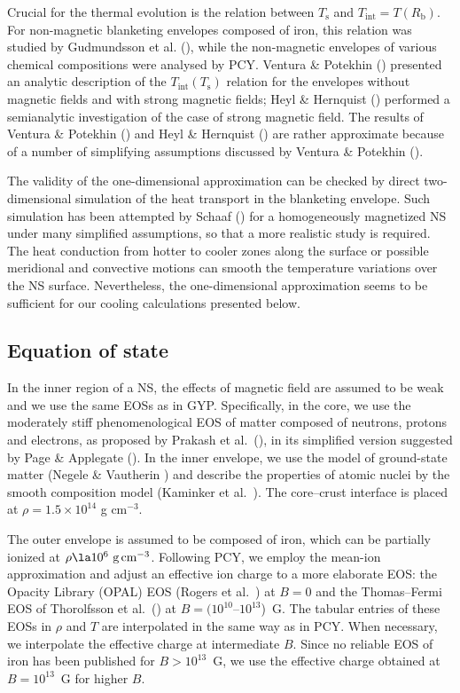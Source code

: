 \documentclass{aa}
\begin{document}
Crucial for the thermal evolution is the relation between
$T_\mathrm{s}$ and $T_\mathrm{int}=T(R_\mathrm{b})$. 
For non-magnetic blanketing envelopes composed of iron,
this relation was studied by Gudmundsson et al. (\cite{gpe83}),
while the non-magnetic envelopes of various chemical compositions
were analysed by PCY.
Ventura \& Potekhin (\cite{elounda})
presented an analytic description of
the $T_\mathrm{int}(T_\mathrm{s})$ relation
for the envelopes without magnetic fields and with
strong magnetic fields; Heyl \& Hernquist (\cite{hh-theory})
performed a 
semianalytic investigation of the case of strong magnetic field.
The results of Ventura \& Potekhin (\cite{elounda})
and Heyl \& Hernquist (\cite{hh-theory})
are rather approximate because of a number
of simplifying assumptions discussed
by Ventura \& Potekhin (\cite{elounda}).

The validity of the one-dimensional approximation can be checked
by direct two-dimensional simulation of the heat transport 
in the blanketing envelope. 
Such simulation has been attempted by Schaaf (\cite{schaaf})
for a homogeneously magnetized NS
under many simplified assumptions, so that
a more realistic study is required.
The heat conduction
from hotter to cooler zones along the surface 
or possible meridional and convective motions
can smooth the temperature variations over the NS surface.
Nevertheless, the one-dimensional approximation seems to be
sufficient for our cooling calculations presented below.

\subsection{Equation of state}
%
In the inner region of a NS,
the effects of magnetic field are assumed to be
weak and we use
the same EOSs as in GYP.
Specifically, in the core, we use
the moderately stiff phenomenological EOS of
matter composed of neutrons, protons and electrons, as proposed by
Prakash et al.\ (\cite{pal88}), in its simplified version suggested
by Page \& Applegate (\cite{pa92}).
In the inner envelope, we use the model of
ground-state matter (Negele \& Vautherin \cite{nv73})
and describe the properties of atomic nuclei
by the smooth composition model 
(Kaminker et al.\ \cite{kaminker99}). The
core--crust interface is placed at $\rho=1.5 \times 10^{14}$ g
cm$^{-3}$.  

The outer envelope is assumed to be composed of iron,
which can be partially ionized at $\rho\la10^6\mbox{~g\,cm$^{-3}$}$.
Following PCY, 
we employ the mean-ion approximation
and adjust an effective ion charge 
to a more elaborate EOS:
the Opacity Library (OPAL) 
EOS (Rogers et al.\ \cite{OPAL_EOS}) at $B=0$ and
the Thomas--Fermi EOS of Thorolfsson et al.\ (\cite{Thorolf})
at $B=(10^{10}$--$10^{13}$)~G.
The tabular entries of these EOSs in $\rho$ and $T$ are interpolated
in the same way as in PCY.
When necessary, we interpolate the effective charge at intermediate $B$.
Since no reliable EOS of iron has been published for $B>10^{13}$~G,
we use the effective charge obtained at $B=10^{13}$~G for
higher $B$.
\end{document}
